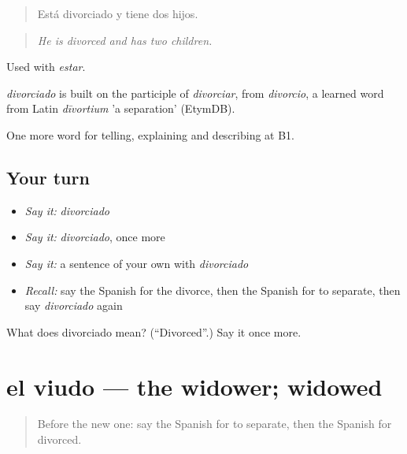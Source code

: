 \begin{quote}
Está divorciado y tiene dos hijos.
\end{quote}

\begin{quote}
\emph{He is divorced and has two children.}
\end{quote}

Used with \emph{estar}.

\begin{cousinweb}
\emph{divorciado} is built on the participle of \emph{divorciar}, from \emph{divorcio}, a learned word from Latin \emph{dīvortium} 'a separation' (EtymDB).
\end{cousinweb}

\begin{grammarlens}[title={What you've built}]
One more word for telling, explaining and describing at B1.
\end{grammarlens}

\subsection*{Your turn}
\begin{itemize}
\raggedright
  \item \emph{Say it:} \emph{divorciado}
  \item \emph{Say it:} \emph{divorciado}, once more
  \item \emph{Say it:} a sentence of your own with \emph{divorciado}
  \item \emph{Recall:} say the Spanish for the divorce, then the Spanish for to separate, then say \emph{divorciado} again
\end{itemize}

\begin{tcolorbox}[breakable,colback=teal!4,colframe=teal!35!black,title={Before you move on}]
What does divorciado mean? (\textquotedblleft{}Divorced\textquotedblright{}.) Say it once more.
\end{tcolorbox}
\section[el viudo]{el viudo — the widower; widowed}

\label{lesson:ES-C550-viudo}



\begin{quote}
Before the new one: say the Spanish for to separate, then the Spanish for divorced.
\end{quote}


